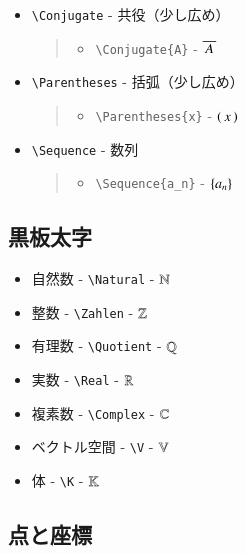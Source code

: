 \documentclass[oneside,10pt,a4paper]{jsarticle}
\begin{document}
\begin{itemize}
\begin{quote}
\begin{itemize}
        \end{itemize}
      \end{quote}
    \item \verb|\Conjugate| - 共役（少し広め）
      \begin{quote}
        \Example
        \begin{itemize}
          \item \verb|\Conjugate{A}| - $\overline{ \, A \, }$
        \end{itemize}
      \end{quote}
    \item \verb|\Parentheses| - 括弧（少し広め）
      \begin{quote}
        \Example
        \begin{itemize}
          \item \verb|\Parentheses{x}| - $\left( \, x \, \right)$
        \end{itemize}
      \end{quote}
    \item \verb|\Sequence| - 数列
      \begin{quote}
        \Example
        \begin{itemize}
          \item \verb|\Sequence{a_n}| - $\left\{ a_n \right\}$
        \end{itemize}
      \end{quote}
  \end{itemize}

  \newpage

  \subsection{黒板太字}

  \begin{itemize}
    \item 自然数 - \verb|\Natural| - $\mathbb{N}$
    \item 整数 - \verb|\Zahlen| - $\mathbb{Z}$
    \item 有理数 - \verb|\Quotient| - $\mathbb{Q}$
    \item 実数 - \verb|\Real| - $\mathbb{R}$
    \item 複素数 - \verb|\Complex| - $\mathbb{C}$
    \item ベクトル空間 - \verb|\V| - $\mathbb{V}$
    \item 体 - \verb|\K| - $\mathbb{K}$
  \end{itemize}

  \subsection{点と座標}
\end{document}
